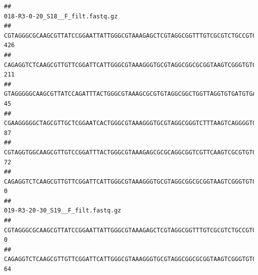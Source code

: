 \documentclass[]{article}
\begin{document}
\begin{verbatim}
##                                                                                                                                                                                                                                                           018-R3-0-20_S18__F_filt.fastq.gz
## CGTAGGGCGCAAGCGTTATCCGGAATTATTGGGCGTAAAGAGCTCGTAGGCGGTTTGTCGCGTCTGCCGTGAAAGTCCGGGGCTCAACTCCGGATCTGCGGTGGGTACGGGCAGACTAGAGTGATGTAGGGGAGACTGGAATTCCTGGTGTAGCGGTGAAATGCGCAGATATCAGGAGGAACACCGATGGCGAAGGCAGGTCTCTGGGCATTAACTGACGCTGAGGAGCGAAAGCATGGGGAGCGAACA                              426
## CAGAGGTCTCAAGCGTTGTTCGGATTCATTGGGCGTAAAGGGTGCGTAGGCGGCGCGGTAAGTCGGGTGTGAAATCTCGGAGCTTAACTCCGAAACTGCATTCGATACTGCCGTGCTTGAGGACTGGAGAGGAGACTGGAATTTACGGTGTAGCGGTGAAATGCGTAGATATCGTAAGGAAGACCAGTGGCGAAGGCGGGTCTCTGGACAGTTCCTGACGCTGAGGCACGAAGGCCAGGGGAGCAAACG                              211
## GTAGGGGGCAAGCGTTATCCAGATTTACTGGGCGTAAAGCGCGTGTAGGCGGCTGGTTAGGTGTGATGTGAAATCTTCCGGCTCAACCGGAAAACTGCATTGCAAACCGGCCTGGCTAGAGTGCAGGAGAGGGAAGCGGAATTCCAGGTGTAGCGGTGAAATGCGTAGATATCTGGAGGAACACCAGTGGCGAAGGCGGCTTCCTGGCCTGCAACTGACGCTGAGACGCGAAAGCGTGGGGAGCGAAC                                45
## CGAAGGGGGCTAGCGTTGCTCGGAATCACTGGGCGTAAAGGGTGCGTAGGCGGGTCTTTAAGTCAGGGGTGAAATCCTGGAGCTCAACTCCAGAACTGCCTTTGATACTGAAGATCTTGAGTTCGGGAGAGGTGAGTGGAACTGCGAGTGTAGAGGTGAAATTCGTAGATATTCGCAAGAACACCAGTGGCGAAGGCGGCTCACTGGCCCGATACTGACGCTGAGGCACGAAAGCGTGGGGAGCAAACA                               87
## CGTAGGTGGCAAGCGTTGTCCGGATTTACTGGGCGTAAAGAGCGCGCAGGCGGTCGTTCAAGTCGCGTGTGAAAGCCCCCGGCTCAACTGGGGAGGGTCACGCGATACTGATCGACTCGAAGGCAGGAGAGGGTAGTGGAATTCCCGGTGTAGTGGTGAAATGCGTAGATATCGGGAGGAACACCAGTGGCGAAGGCGACTACCTGGCCTGTTCTTGACGCTGAGGCGCGAAAGCTAGGGGAGCAAACG                               72
## CAGAGGTCTCAAGCGTTGTTCGGATTCATTGGGCGTAAAGGGTGCGTAGGCGGCGCGGTAAGTCGGGTGTGAAATCTCGGGGCTTAACTCCGAAACTGCATTCGATACTGCCGTGCTTGAGGACTGGAGAGGAGACTGGAATTTACGGTGTAGCGGTGAAATGCGTAGATATCGTAAGGAAGACCAGTGGCGAAGGCGGGTCTCTGGACAGTTCCTGACGCTGAGGCACGAAGGCCAGGGGAGCAAACG                                0
##                                                                                                                                                                                                                                                           019-R3-20-30_S19__F_filt.fastq.gz
## CGTAGGGCGCAAGCGTTATCCGGAATTATTGGGCGTAAAGAGCTCGTAGGCGGTTTGTCGCGTCTGCCGTGAAAGTCCGGGGCTCAACTCCGGATCTGCGGTGGGTACGGGCAGACTAGAGTGATGTAGGGGAGACTGGAATTCCTGGTGTAGCGGTGAAATGCGCAGATATCAGGAGGAACACCGATGGCGAAGGCAGGTCTCTGGGCATTAACTGACGCTGAGGAGCGAAAGCATGGGGAGCGAACA                                 0
## CAGAGGTCTCAAGCGTTGTTCGGATTCATTGGGCGTAAAGGGTGCGTAGGCGGCGCGGTAAGTCGGGTGTGAAATCTCGGAGCTTAACTCCGAAACTGCATTCGATACTGCCGTGCTTGAGGACTGGAGAGGAGACTGGAATTTACGGTGTAGCGGTGAAATGCGTAGATATCGTAAGGAAGACCAGTGGCGAAGGCGGGTCTCTGGACAGTTCCTGACGCTGAGGCACGAAGGCCAGGGGAGCAAACG                                64

\end{verbatim}
\end{document}
